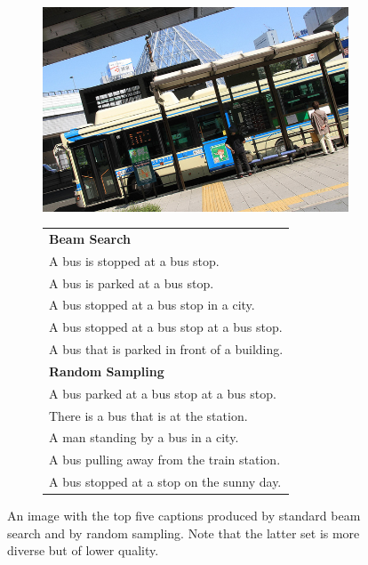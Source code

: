 \documentclass[thesis.tex]{subfiles}
\begin{document}
\begin{figure}[bt]
    \scriptsize
    \begin{subfigure}[l]{0.6\linewidth}
    \includegraphics[width=\linewidth]{pictures/COCO_val2014_000000155401.jpg}
    \end{subfigure}
    \begin{subfigure}[l]{0.5\linewidth}
    \begin{tabular}{l}
\textbf{Beam Search}  \\
A bus is stopped at a bus stop. \\
A bus is parked at a bus stop. \\
A bus stopped at a bus stop in a city. \\
A bus stopped at a bus stop at a bus stop. \\
A bus that is parked in front of a building. \\ \hline
\textbf{Random Sampling}  \\
A bus parked at a bus stop at a bus stop.  \\
There is a bus that is at the station. \\
A man standing by a bus in a city.  \\
A bus pulling away from the train station. \\
A bus stopped at a stop on the sunny day. \\
    \end{tabular}
    \end{subfigure}
    \caption{An image with the top five captions produced by standard beam search and by random sampling. Note that the latter set is more diverse but of lower quality.}
    \label{first_example}
\end{figure}
\end{document}
